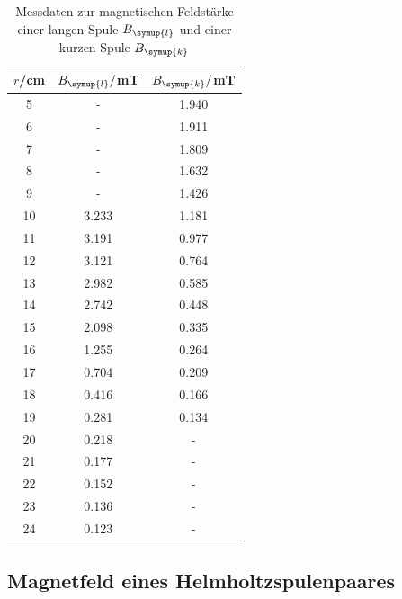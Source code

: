 \documentclass[
  bibliography=totoc,     %
  captions=tableheading,  %
  titlepage=firstiscover, %
]{scrartcl}
\begin{document}
  \begin{table}
    \centering
      \caption{Messdaten zur magnetischen Feldstärke einer langen Spule $B_{\symup{l}}$ und einer kurzen Spule $B_{\symup{k}}$}
      \label{tab:einzelne_spulen}
      \begin{tabular}{c c c}
        \toprule
         $r$/cm & $B_{\symup{l}}/$mT & $B_{\symup{k}}/$mT\\
        
        \midrule
        
         5 & - & 1.940\\
         6 & - & 1.911\\
         7 & - & 1.809\\
         8 & - & 1.632\\
         9 & - & 1.426\\
        10 & 3.233 & 1.181\\
        11 & 3.191 & 0.977\\
        12 & 3.121 & 0.764\\
        13 & 2.982 & 0.585\\
        14 & 2.742 & 0.448\\
        15 & 2.098 & 0.335\\
        16 & 1.255 & 0.264\\
        17 & 0.704 & 0.209\\
        18 & 0.416 & 0.166\\
        19 & 0.281 & 0.134\\
        20 & 0.218 & -\\
        21 & 0.177 & -\\
        22 & 0.152 & -\\
        23 & 0.136 & -\\
        24 & 0.123 & -\\
        
        \bottomrule
      \end{tabular}
  \end{table}

  \FloatBarrier

  \newpage
  \subsection{Magnetfeld eines Helmholtzspulenpaares}
\end{document}
